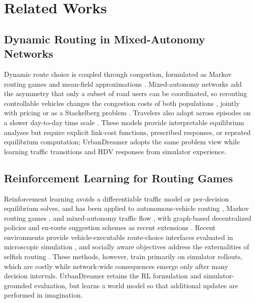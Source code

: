 \section{Related Works}

\subsection{Dynamic Routing in Mixed-Autonomy Networks}

Dynamic route choice is coupled through congestion, formulated as Markov
routing games \cite{calderone2017markov} and mean-field approximations
\cite{tanaka2020linearly,cabannes2022solving}.  Mixed-autonomy networks add
the asymmetry that only a subset of road users can be coordinated, so
rerouting controllable vehicles changes the congestion costs of both
populations \cite{lazar2017capacity,lazar2020routing}, jointly with pricing
\cite{mansourianfar2021joint} or as a Stackelberg problem
\cite{kolarich2022stackelberg}.  Travelers also adapt across episodes on a
slower day-to-day time scale \cite{liang2023day,yi2026routing,hou2025traffic}.
These models provide interpretable equilibrium analyses but require explicit
link-cost functions, prescribed responses, or repeated equilibrium
computation; UrbanDreamer adopts the same problem view while learning
traffic transitions and HDV responses from simulator experience.

\subsection{Reinforcement Learning for Routing Games}

Reinforcement learning avoids a differentiable traffic model or per-decision
equilibrium solves, and has been applied to autonomous-vehicle routing
\cite{lazar2021learning}, Markov routing games \cite{shou2022multi}, and
mixed-autonomy traffic flow \cite{vinitsky2023optimizing}, with graph-based
decentralized policies and en-route suggestion schemes as recent extensions
\cite{mahmoud2026decentralized,ma2024providing}.  Recent environments
provide vehicle-executable route-choice interfaces evaluated in microscopic
simulation
\cite{thomasini2023routechoiceenv,akman2025routerl,akman2026urb,psarou2026optimizing},
and socially aware objectives address the externalities of selfish routing
\cite{psarou2025autonomous,psarou2026position}.  These methods, however,
train primarily on simulator rollouts, which are costly while network-wide
consequences emerge only after many decision intervals.  UrbanDreamer
retains the RL formulation and simulator-grounded evaluation, but learns a
world model so that additional updates are performed in imagination.

